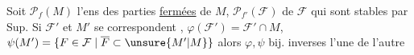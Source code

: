  Soit $\mathcal P_f(M)$ l'ens des parties \uline{fermées} de $M$, $\mathcal P_{f'}(\mathcal F)$ de $\mathcal F$ qui sont stables par Sup. Si $\mathcal F'$ et $M'$ se correspondent , 
$\varphi(\mathcal F')=\mathcal F'\cap M$, $\psi(M')=\{F\in\mathcal F\mid\overline F\subset \unsure{M'|M}\}$ alors $\varphi,\psi$ bij. inverses l'une de l'autre
